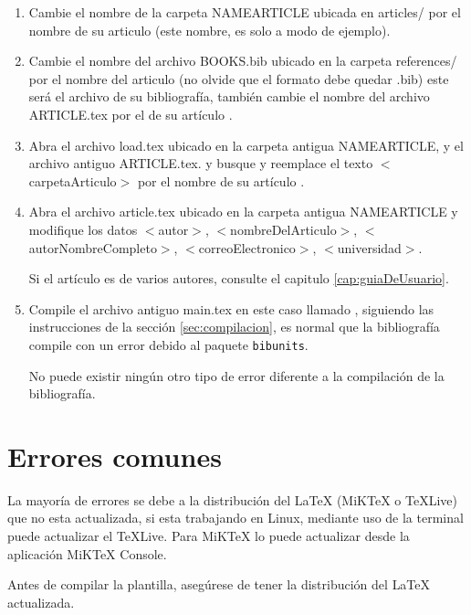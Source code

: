 {	\begin{enumerate}
		\item Cambie el nombre de la carpeta NAMEARTICLE ubicada en articles/ por el nombre de su articulo  (este nombre, es solo a modo de ejemplo).
		\item Cambie el nombre del archivo BOOKS.bib ubicado en la carpeta references/ por el nombre del articulo  (no olvide que el formato debe quedar .bib) este será el archivo de su bibliografía, también cambie el nombre del archivo ARTICLE.tex por el de su artículo .
		\item Abra el archivo load.tex ubicado en la carpeta antigua NAMEARTICLE, y el archivo antiguo ARTICLE.tex.
		y busque y reemplace el texto $<$carpetaArticulo$>$ por el nombre de su artículo .
		\item Abra el archivo article.tex ubicado en la carpeta antigua NAMEARTICLE y modifique los datos $<$autor$>$, $<$nombreDelArticulo$>$, $<$autorNombreCompleto$>$, $<$correoElectronico$>$, $<$universidad$>$.
		\begin{mybox}[Nota]
			Si el artículo es de varios autores, consulte el capitulo \ref{cap:guiaDeUsuario}.
		\end{mybox}
		\item Compile el archivo antiguo main.tex en este caso llamado , siguiendo las instrucciones de la sección \ref{sec:compilacion}, es normal que la bibliografía compile con un error debido al paquete \verb|bibunits|.
		\begin{mybox}[Nota]
			No puede existir ningún otro tipo de error diferente a la compilación de la bibliografía.
		\end{mybox}
	\end{enumerate}
	\section{Errores comunes}
	La mayoría de errores se debe a la distribución del {\LaTeX} (MiKTeX o TeXLive) que no esta actualizada, si esta trabajando en Linux, mediante uso de la terminal puede actualizar el TeXLive. Para MiKTeX lo puede actualizar desde la aplicación MiKTeX Console.
	\begin{mybox}[Recomendación]
		Antes de compilar la plantilla, asegúrese de tener la distribución del {\LaTeX} actualizada.
	\end{mybox}
}
